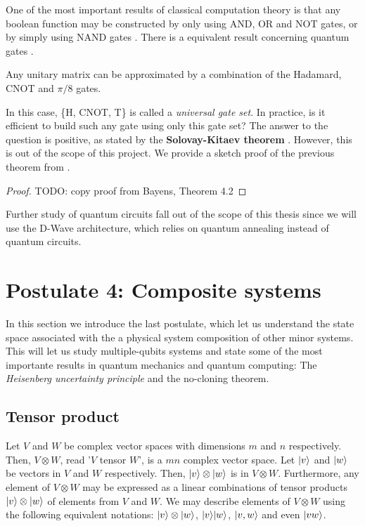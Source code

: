 One of the most important results of classical computation theory is that any boolean function may be constructed by only using AND, OR and NOT gates, or by simply using NAND gates \cite{Lau2006}. There is a equivalent result concerning quantum gates \cite{Bayens2019}.

\begin{theorem}
	Any unitary matrix can be approximated by a combination of the Hadamard, CNOT and $\pi/8$ gates.
\end{theorem}

In this case, \{H, CNOT, T\} is called a \emph{universal gate set}. In practice, is it efficient to build such any gate using only this gate set? The answer to the question is positive, as stated by the \textbf{Solovay-Kitaev theorem} \cite{Dawson2006}. However, this is out of the scope of this project. We provide a sketch proof of the previous theorem from \cite{Bayens2019}.

\begin{proof}
	TODO: copy proof from Bayens, Theorem 4.2
\end{proof}

Further study of quantum circuits fall out of the scope of this thesis since we will use the D-Wave architecture, which relies on quantum annealing instead of quantum circuits.

\section{Postulate 4: Composite systems}


In this section we introduce the last postulate, which let us understand the state space associated with the a physical system composition of other minor systems. This will let us study multiple-qubits systems and state some of the most importante results in quantum mechanics and quantum computing: The \emph{Heisenberg uncertainty principle} and the no-cloning theorem.


\subsection{Tensor product}


Let $V$ and $W$ be complex vector spaces with dimensions $m$ and $n$ respectively. Then, $V \otimes W$, read '$V$ tensor $W$', is a $mn$ complex vector space. Let $|v\rangle$ and $|w\rangle$ be vectors in $V$ and $W$ respectively. Then, $|v\rangle \otimes |w\rangle$ is in $V \otimes W$. Furthermore, any element of $V \otimes W$ may be expressed as a linear combinations of tensor products $|v\rangle \otimes |w\rangle$ of elements from $V$ and $W$. We may describe elements of $V \otimes W$ using the following equivalent notations: $|v\rangle \otimes |w\rangle$, $|v\rangle|w\rangle$, $|v, w\rangle$ and even $|vw\rangle$.

